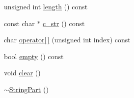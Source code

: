 \begin{DoxyCompactItemize}
\item 
unsigned int \hyperlink{classmiosix_1_1_string_part_ad04cce060bd75ed75f9696dedffff2df}{length} () const 
\item 
const char $\ast$ \hyperlink{classmiosix_1_1_string_part_a76e99ccb0a74ecfe46875fe3a8ff523c}{c\-\_\-str} () const 
\item 
char \hyperlink{classmiosix_1_1_string_part_af39bce70e2b975b2589a012d1cc07686}{operator\mbox{[}$\,$\mbox{]}} (unsigned int index) const 
\item 
bool \hyperlink{classmiosix_1_1_string_part_ac6d39462db19b88c245561710d94ad8b}{empty} () const 
\item 
void \hyperlink{classmiosix_1_1_string_part_a5356ca70f6efc0cab726fbd8a2c6bf5a}{clear} ()
\item 
\hyperlink{classmiosix_1_1_string_part_ae80637683f6a1b14285a1eb1e32f3587}{$\sim$\-String\-Part} ()
\end{DoxyCompactItemize}



